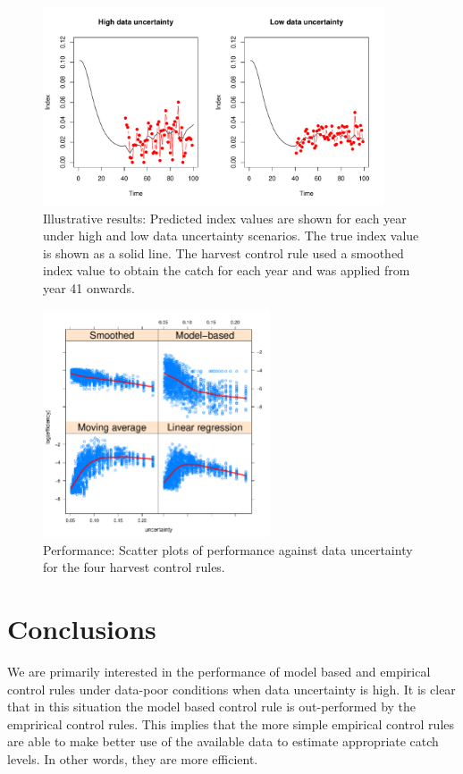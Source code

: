 \documentclass[11pt]{article} %
\begin{document}
\begin{figure}
\includegraphics[width=0.9\textwidth]{../res/uncertainty_index.pdf}
\caption{Illustrative results: Predicted index values are shown for each year under high and low data uncertainty scenarios. The true index value is shown as a solid line. The harvest control rule used a smoothed index value to obtain the catch for each year and was applied from year 41 onwards.}
\label{fig:ires}
\end{figure}

\begin{figure}
\includegraphics[width=0.6\textwidth]{../res/hcr_all_plot.pdf}
\caption{Performance: Scatter plots of performance against data uncertainty for the four harvest control rules.}
\label{fig:fres}
\end{figure}

\section{Conclusions}

We are primarily interested in the performance of model based and empirical control rules under data-poor conditions when data uncertainty is high. It is clear that in this situation the model based control rule is out-performed by the emprirical control rules. This implies that the more simple empirical control rules are able to make better use of the available data to estimate appropriate catch levels. In other words, they are more efficient. 
\end{document}
